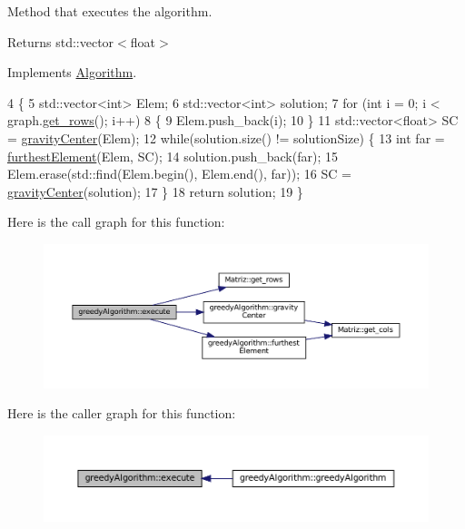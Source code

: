 Method that executes the algorithm. 

\begin{DoxyReturn}{Returns}
std\+::vector$<$float$>$ 
\end{DoxyReturn}


Implements \hyperlink{classAlgorithm_af6ea9eb9a6dbd41896e3fd7dabac096b}{Algorithm}.


\begin{DoxyCode}
4 \{
5   std::vector<int> Elem;
6   std::vector<int> solution;
7   \textcolor{keywordflow}{for} (\textcolor{keywordtype}{int} i = 0; i < graph.\hyperlink{classMatriz_a6b18342f8c083baece693ff41185a206}{get\_rows}(); i++)
8   \{
9     Elem.push\_back(i);
10   \}
11   std::vector<float> SC = \hyperlink{classgreedyAlgorithm_a1ba2f9ae707c3d68f0af86ea320f80cf}{gravityCenter}(Elem);
12   \textcolor{keywordflow}{while}(solution.size() != solutionSize) \{
13     \textcolor{keywordtype}{int} far = \hyperlink{classgreedyAlgorithm_afb8dddb24fefb88da82011db8c07e17c}{furthestElement}(Elem, SC);
14     solution.push\_back(far);
15     Elem.erase(std::find(Elem.begin(), Elem.end(), far));
16     SC = \hyperlink{classgreedyAlgorithm_a1ba2f9ae707c3d68f0af86ea320f80cf}{gravityCenter}(solution);
17   \}
18   \textcolor{keywordflow}{return} solution;
19 \}
\end{DoxyCode}
Here is the call graph for this function\+:
\nopagebreak
\begin{figure}[H]
\begin{center}
\leavevmode
\includegraphics[width=350pt]{classgreedyAlgorithm_a37c81600b24a32ae25b6f0eeab643a7a_cgraph}
\end{center}
\end{figure}
Here is the caller graph for this function\+:
\nopagebreak
\begin{figure}[H]
\begin{center}
\leavevmode
\includegraphics[width=350pt]{classgreedyAlgorithm_a37c81600b24a32ae25b6f0eeab643a7a_icgraph}
\end{center}
\end{figure}
\mbox{\label{classgreedyAlgorithm_afb8dddb24fefb88da82011db8c07e17c}} 
